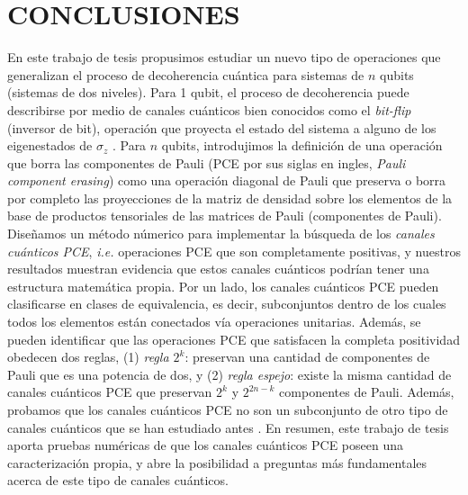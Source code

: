 

\chapter{CONCLUSIONES}
En este trabajo de tesis propusimos estudiar un nuevo tipo de operaciones 
que generalizan el proceso de decoherencia cuántica para sistemas de $n$ qubits 
(sistemas de dos niveles). Para 1 qubit, el proceso de decoherencia
puede describirse por medio de canales cuánticos bien conocidos como 
el \textit{bit-flip} (inversor de bit), operación que proyecta el estado del 
sistema a alguno de los eigenestados de $\sigma_z$
\cite{bengtsson_zyczkowski_2017,nathanson2007pauli,nielsen_chuang_2011}. 
Para $n$ qubits, 
introdujimos la definición de una operación que borra las componentes de Pauli
(PCE por sus siglas en ingles, \textit{Pauli component erasing}) como una 
operación diagonal de Pauli que preserva o borra por completo 
las proyecciones de la matriz de densidad sobre los elementos de la
base de productos tensoriales de las matrices de Pauli (componentes de Pauli). 
Diseñamos un método 
númerico para implementar la búsqueda de los \textit{canales cuánticos PCE},
\textit{i.e.} operaciones PCE que son completamente positivas, y nuestros 
resultados muestran evidencia que estos canales cuánticos podrían tener
una estructura matemática propia. 
Por un lado, los canales cuánticos PCE pueden clasificarse en clases de equivalencia, 
es decir, subconjuntos dentro de los cuales todos los elementos están 
conectados vía operaciones unitarias. 
Además, se pueden identificar que las operaciones PCE 
que satisfacen la completa positividad obedecen dos reglas, (1) \textit{regla
$\mathit{2^k}$}: preservan una cantidad de componentes de Pauli
que es una potencia de dos, y (2) \textit{regla espejo}:
existe la misma cantidad de canales cuánticos PCE que preservan $2^k$ 
y $2^{2n-k}$ componentes de Pauli.
Además, probamos que los canales cuánticos PCE no son un subconjunto
de otro tipo de canales cuánticos que se han estudiado antes 
\cite{nathanson2007pauli}. 
En resumen, este trabajo de tesis aporta pruebas numéricas
de que los canales cuánticos PCE
poseen una caracterización 
propia, y abre la posibilidad a preguntas más fundamentales acerca de este 
tipo de canales cuánticos.

